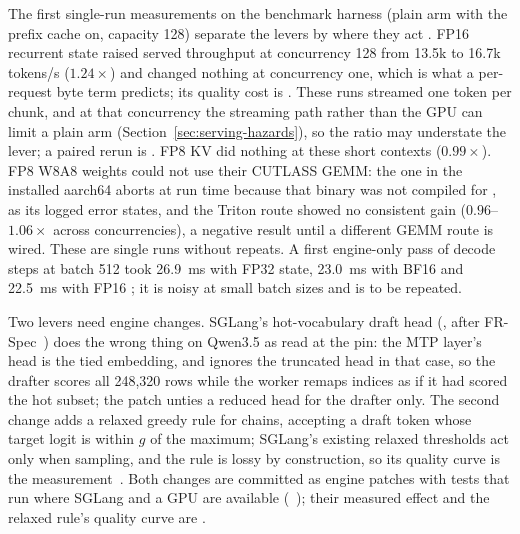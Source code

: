 The first single-run measurements on the benchmark harness (plain arm with the prefix cache on, capacity 128) separate the levers by where they act . FP16 recurrent state raised served throughput at concurrency 128 from 13.5k to 16.7k tokens/s ($1.24\times$) and changed nothing at concurrency one, which is what a per-request byte term predicts; its quality cost is . These runs streamed one token per chunk, and at that concurrency the streaming path rather than the GPU can limit a plain arm (Section~\ref{sec:serving-hazards}), so the ratio may understate the lever; a paired rerun is . FP8 KV did nothing at these short contexts ($0.99\times$). FP8 W8A8 weights could not use their CUTLASS GEMM: the one in the installed aarch64  aborts at run time because that binary was not compiled for , as its logged error states, and the Triton route showed no consistent gain ($0.96$--$1.06\times$ across concurrencies), a negative result until a different GEMM route is wired. These are single runs without repeats. A first engine-only pass of decode steps at batch 512 took 26.9~ms with FP32 state, 23.0~ms with BF16 and 22.5~ms with FP16 ; it is noisy at small batch sizes and is to be repeated.

Two levers need engine changes. SGLang's hot-vocabulary draft head (, after FR-Spec~\cite{frspec}) does the wrong thing on Qwen3.5 as read at the pin: the MTP layer's head is the tied embedding, and  ignores the truncated head in that case, so the drafter scores all 248,320 rows while the worker remaps indices as if it had scored the hot subset; the patch unties a reduced head for the drafter only. The second change adds a relaxed greedy rule for chains, accepting a draft token whose target logit is within $g$ of the maximum; SGLang's existing relaxed thresholds act only when sampling, and the rule is lossy by construction, so its quality curve is the measurement~\cite{marginsnotwindows}. Both changes are committed as engine patches with tests that run where SGLang and a GPU are available (~); their measured effect and the relaxed rule's quality curve are .

